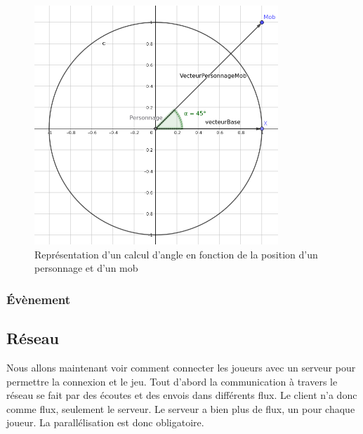 \documentclass[11pt]{article}
\begin{document}
            \begin{figure}[H]
                \centering
                \includegraphics[height=9cm]{cercleTrigo.png}
                \caption{Représentation d'un calcul d'angle en fonction de la position d'un personnage et d'un mob}
                \label{fig:Mob}
            \end{figure}

            \subsubsection{Évènement}
        \subsection{Réseau}
        Nous allons maintenant voir comment connecter les joueurs avec un serveur pour permettre la connexion et le jeu.
	    Tout d’abord la communication à travers le réseau se fait par des écoutes et des envois dans différents flux. 
        Le client n’a donc comme flux, seulement le serveur. Le serveur a bien plus de flux, un pour chaque joueur. 
        La parallélisation est donc obligatoire.
\end{document}
